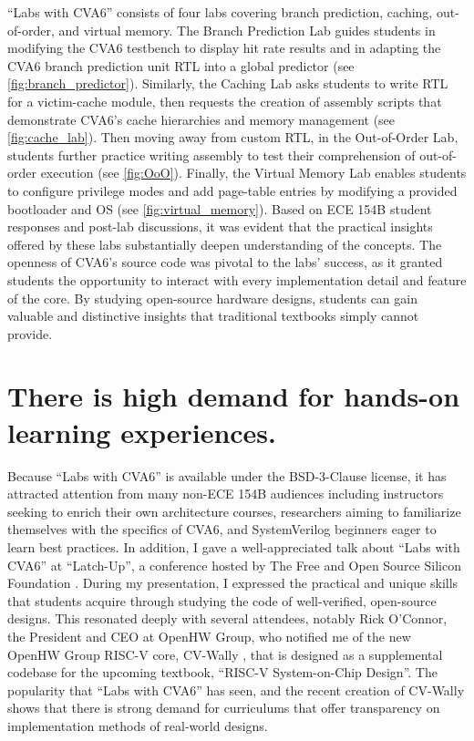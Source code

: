 \enquote{Labs with CVA6} consists of four labs covering branch prediction, caching, out-of-order, and virtual memory.
The Branch Prediction Lab guides students in modifying the CVA6 testbench to display hit rate results and in adapting the CVA6 branch prediction unit RTL into a global predictor (see \autoref{fig:branch_predictor}).
Similarly, the Caching Lab asks students to write RTL for a victim-cache module, then requests the creation of assembly scripts that demonstrate CVA6's cache hierarchies and memory management (see \autoref{fig:cache_lab}).
Then moving away from custom RTL, in the Out-of-Order Lab, students further practice writing assembly to test their comprehension of out-of-order execution (see \autoref{fig:OoO}).
Finally, the Virtual Memory Lab enables students to configure privilege modes and add page-table entries by modifying a provided bootloader and OS (see \autoref{fig:virtual_memory}).
Based on ECE 154B student responses and post-lab discussions, it was evident that the practical insights offered by these labs substantially deepen understanding of the concepts.
The openness of CVA6's source code was pivotal to the labs' success, as it granted students the opportunity to interact with every implementation detail and feature of the core.
By studying open-source hardware designs, students can gain valuable and distinctive insights that traditional textbooks simply cannot provide.

\FloatBarrier

\section{There is high demand for hands-on learning experiences.}

Because \enquote{Labs with CVA6} is available under the BSD-3-Clause license, it has attracted attention from many non-ECE 154B audiences including instructors seeking to enrich their own architecture courses, researchers aiming to familiarize themselves with the specifics of CVA6, and SystemVerilog beginners eager to learn best practices.
In addition, I gave a well-appreciated talk about \enquote{Labs with CVA6} at \enquote{Latch-Up}, a conference hosted by The Free and Open Source Silicon Foundation \cite{SiffermanLatchUp}.
During my presentation, I expressed the practical and unique skills that students acquire through studying the code of well-verified, open-source designs.
This resonated deeply with several attendees, notably Rick O'Connor, the President and CEO at OpenHW Group, who notified me of the new OpenHW Group RISC-V core, CV-Wally \cite{cvwally}, that is designed as a supplemental codebase for the upcoming textbook, \enquote{RISC-V System-on-Chip Design}.
The popularity that \enquote{Labs with CVA6} has seen, and the recent creation of CV-Wally shows that there is strong demand for curriculums that offer transparency on implementation methods of real-world designs.
